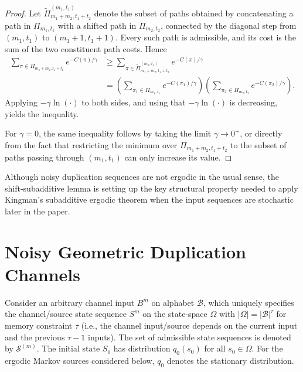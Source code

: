 \documentclass[onecolumn]{IEEEtran}
\theoremstyle{definition}
\begin{document}
\begin{proof}
{Let
\(\widetilde{\Pi}^{(m_1,t_1)}_{m_1+m_2,t_1+t_2}\)
denote the subset of paths obtained by concatenating a path in
\(\Pi_{m_1,t_1}\) with a shifted path in \(\Pi_{m_2,t_2}\), connected by
the diagonal step from \((m_1,t_1)\) to \((m_1+1,t_1+1)\).}
Every such path is admissible, and its cost is the sum of the two
constituent path costs. Hence
\begin{equation*}
\begin{aligned}
\sum_{\pi\in\Pi_{m_1+m_2,t_1+t_2}}
e^{-C(\pi)/\gamma}
&\ge
\sum_{\pi\in\widetilde{\Pi}^{(m_1,t_1)}_{m_1+m_2,t_1+t_2}}
e^{-C(\pi)/\gamma}
\\
&=
\left(
\sum_{\pi_1\in\Pi_{m_1,t_1}}
e^{-C(\pi_1)/\gamma}
\right)
\left(
\sum_{\pi_2\in\Pi_{m_2,t_2}}
e^{-C(\pi_2)/\gamma}
\right).
\end{aligned}
\end{equation*}
Applying \(-\gamma \ln(\cdot)\) to both sides, and using that \(-\gamma\ln(\cdot)\) is decreasing, yields the inequality.

For \(\gamma=0\), the same inequality follows by taking the limit \(\gamma \to 0^+\), or directly from the fact that restricting the minimum over \(\Pi_{m_1+m_2,t_1+t_2}\) to the subset of paths passing through \((m_1,t_1)\) can only increase its value.
\end{proof}

Although noisy duplication sequences are not ergodic in the usual sense, the shift-subadditive lemma is setting up the key structural property needed to apply Kingman’s subadditive ergodic theorem \cite{Kingman1968} when the input sequences are stochastic later in the paper.



\section{Noisy Geometric Duplication Channels}\label{sec:channel_model}

Consider an arbitrary channel input $B^m$ on alphabet $\mathcal{B}$, which uniquely specifies the channel/source state sequence $S^m$ on the state-space $\Omega$ with $|\Omega|=|\mathcal{B}|^{\tau}$ for memory constraint $\tau$ (i.e., the channel input/source depends on the current input and the previous $\tau-1$ inputs). The set of admissible state sequences is denoted by $\mathcal{S}^{(m)}$. The initial state $S_0$ has distribution $q_0(s_0)$ for all $s_0 \in \Omega$. {For the ergodic Markov sources considered below, $q_0$
denotes the stationary distribution.}
\end{document}
